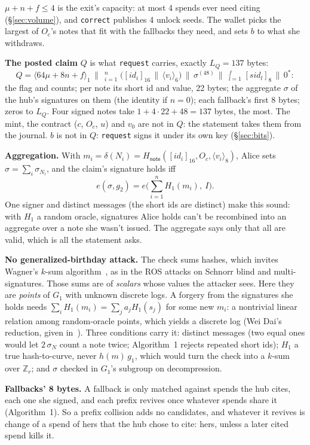 \documentclass[11pt]{article}
\theoremstyle{plain}
\theoremstyle{definition}
\newcommand{\tx}[1]{\texttt{#1}}
\newcommand{\be}[2]{\langle #1\rangle_{#2}}
\newcommand{\pre}[2]{[#1]_{#2}}
\newcommand{\Ht}[1]{H_{\textsf{#1}}}
\newcommand{\sid}{\mathit{sid}}
\newcommand{\Oc}{O_c}
\newcommand{\Hg}{H_{1}}
\begin{document}
$\mu + n + f \le 4$ is the exit's capacity: at most 4 spends ever need
citing (\S\ref{sec:volume}), and \tx{correct} publishes 4 unlock seeds.
The wallet picks the largest of $\Oc$'s notes that fit with the
fallbacks they need, and sets $b$ to what she withdraws.

\textbf{The posted claim} $Q$ is what \tx{request} carries, exactly
$L_Q = 137$ bytes:
\[
  Q = \be{64\mu + 8n + f}{1} \,\big\|\, \mathop{\big\|}_{i=1}^{n}
  \big(\pre{\mathit{id}_i}{16} \,\|\, \be{v_i}{6}\big)
  \,\big\|\, \sigma^{(48)} \,\big\|\, \mathop{\big\|}_{l=1}^{f} \pre{\sid_l}{8}
  \,\big\|\, 0^{\ast}:
\]
the flag and counts; per note its short id and value, 22 bytes; the
aggregate $\sigma$ of the hub's signatures on them (the identity if $n
= 0$); each fallback's first 8 bytes; zeros to $L_Q$. Four signed notes
take $1 + 4 \cdot 22 + 48 = 137$ bytes, the most. The mint, the
contract ($c$, $\Oc$, $u$) and $v_0$ are not in $Q$: the statement
takes them from the journal. $b$ is not in $Q$: \tx{request} signs it
under its own key (\S\ref{sec:bits}).

\textbf{Aggregation.} With $m_i = \delta(N_i) =
\Ht{note}(\pre{\mathit{id}_i}{16}, \Oc, \be{v_i}{8})$, Alice sets $\sigma
= \sum_i \sigma_{N_i}$, and the claim's signature holds iff
\[
  e(\sigma, g_2) = e\Big(\sum_{i=1}^{n} \Hg(m_i),\ I\Big).
\]
One signer and distinct messages (the short ids are distinct) make this
sound: with $\Hg$ a random oracle, signatures Alice holds can't be
recombined into an aggregate over a note she wasn't issued. The
aggregate says only that all are valid, which is all the statement
asks.

\textbf{No generalized-birthday attack.} The check sums hashes, which
invites Wagner's $k$-sum algorithm~\cite{wagner}, as in the ROS attacks
on Schnorr blind and multi-signatures. Those sums are of \emph{scalars}
whose values the attacker sees. Here they are \emph{points} of $G_1$
with unknown discrete logs. A forgery from the signatures she holds
needs $\sum_i \Hg(m_i) = \sum_j a_j \Hg(s_j)$ for some new $m_i$: a
nontrivial linear relation among random-oracle points, which yields a
discrete log (Wei Dai's reduction, given in~\cite{wagner}). Three
conditions carry it: distinct messages (two equal ones would let $2\,
\sigma_N$ count a note twice; Algorithm~1 rejects repeated short ids);
$\Hg$ a true hash-to-curve, never $h(m)\,g_1$, which would turn the
check into a $k$-sum over $\mathbb{Z}_r$; and $\sigma$ checked in
$G_1$'s subgroup on decompression.

\textbf{Fallbacks' 8 bytes.} A fallback is only matched against spends
the hub cites, each one she signed, and each prefix revives once
whatever spends share it (Algorithm~1). So a prefix collision adds no
candidates, and whatever it revives is change of a spend of hers that
the hub chose to cite: hers, unless a later cited spend kills it.
\end{document}
